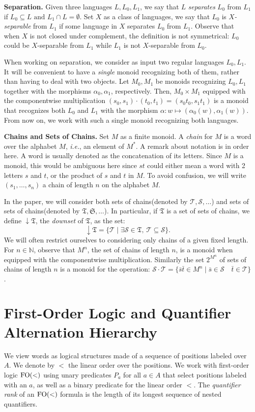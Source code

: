 \documentclass[envcountsame]{llncs}
\newcommand\nat{\ensuremath{\mathbb{N}}\xspace}
\newcommand\Ss{\ensuremath{\mathcal{S}}\xspace}
\newcommand\Ts{\ensuremath{\mathcal{T}}\xspace}
\newcommand{\fow}{\ensuremath{\textup{FO}(<)}\xspace}
\newcommand\chain{chain\xspace}
\newcommand\chains{chains\xspace}
\newcommand\Chains{Chains\xspace}
\newcommand\fS{\ensuremath{\mathfrak S}\xspace}
\newcommand\fT{\ensuremath{\mathfrak T}\xspace}
\DeclareMathOperator{\downclos}{\downarrow}
\begin{document}
\medskip\noindent
{\bf Separation.} Given three languages $L,L_0,L_1$, we say that $L$
\emph{separates} $L_0$ from $L_1$ if $L_0 \subseteq L \text{ and } L_1
\cap L = \emptyset$. Set $X$ as a class of languages, we say that
$L_0$ is \emph{$X$-separable} from $L_1$ if some language in $X$
separates $L_0$ from $L_1$. Observe that when $X$ is not closed under
complement, the definition is not symmetrical: $L_0$ could be
$X$-separable from $L_1$ while $L_1$ is not $X$-separable from $L_0$.

When working on separation, we consider as input two regular languages
$L_0,L_1$. It will be convenient to have a \emph{single} monoid recognizing
both of them, rather than having to deal with two objects. Let $M_0,
M_1$ be monoids recognizing $L_0,L_1$ together with the morphisms
$\alpha_0,\alpha_1$, respectively. Then, $M_0 \times M_1$ equipped
with the componentwise multiplication $(s_0,s_1) \cdot (t_0,t_1)=(s_0
t_0,s_1 t_1)$ is a monoid that recognizes both $L_0$ and $L_1$ with
the morphism $\alpha : w \mapsto (\alpha_0(w),\alpha_1(w))$. From now
on, we work with such a single monoid recognizing both languages.



\medskip
\noindent
{\bf \Chains and Sets of \Chains.} Set $M$ as a finite monoid. A
\emph{\chain } for $M$ is a word over the alphabet $M$, \emph{i.e.}, an
element of $M^*$. A remark about notation is in order here. A word is
usually denoted as the concatenation of its letters. Since $M$ is a
monoid, this would be ambiguous here since $st$ could either mean a
word with 2 letters $s$ and $t$, or the product of $s$ and $t$ in
$M$. To avoid confusion, we will write $(s_1,\dots,s_n)$ a \chain of
length $n$ on the alphabet $M$.

In the paper, we will consider both sets of \chains (denoted by
$\Ts,\Ss,\dots$) and sets of sets of \chains (denoted by $\fT,\fS,
\dots$). In particular, if $\fT$ is a set of sets of \chains, we define
$\downclos \fT$, the \emph{downset} of $\fT$, as the set:
\[
\downclos \fT=\{ \Ts \mid\exists \Ss \in \fT,\ \Ts \subseteq \Ss\}.
\]
We will often restrict ourselves to considering only \chains of a
given fixed length. For $n \in \nat$, observe that $M^n$, the set of
\chains of length $n$, is a monoid when equipped with the
componentwise multiplication. Similarly the set $2^{M^n}$ of sets of \chains of
length $n$ is a monoid for the operation: $\Ss \cdot \Ts =
\{\bar{s}\bar{t} \in M^n \mid \bar{s} \in \Ss \quad \bar{t} \in \Ts\}$.


\section{First-Order Logic and Quantifier Alternation Hierarchy}
\label{sec:logic}
We view words as logical structures made of a sequence of positions labeled
over~$A$. We denote by $<$ the linear order over the positions. We work with
first-order logic \fow using unary predicates $P_a$ for all $a \in A$ that
select positions labeled with an $a$, as well as a binary predicate for the
linear order $<$. The \emph{quantifier rank} of an \fow formula is the length
of its longest sequence of nested quantifiers.
\end{document}
